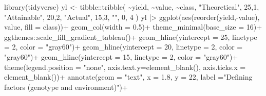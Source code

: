 \documentclass[
  letterpaper,
  DIV=11,
  numbers=noendperiod]{scrreprt}
\newenvironment{Shaded}{\begin{snugshade}}{\end{snugshade}}
\newcommand{\AttributeTok}[1]{\textcolor[rgb]{0.40,0.45,0.13}{#1}}
\newcommand{\DecValTok}[1]{\textcolor[rgb]{0.68,0.00,0.00}{#1}}
\newcommand{\FloatTok}[1]{\textcolor[rgb]{0.68,0.00,0.00}{#1}}
\newcommand{\FunctionTok}[1]{\textcolor[rgb]{0.28,0.35,0.67}{#1}}
\newcommand{\NormalTok}[1]{\textcolor[rgb]{0.00,0.23,0.31}{#1}}
\newcommand{\OtherTok}[1]{\textcolor[rgb]{0.00,0.23,0.31}{#1}}
\newcommand{\SpecialCharTok}[1]{\textcolor[rgb]{0.37,0.37,0.37}{#1}}
\newcommand{\StringTok}[1]{\textcolor[rgb]{0.13,0.47,0.30}{#1}}
\begin{document}
\begin{Shaded}
\begin{Highlighting}[]
\FunctionTok{library}\NormalTok{(tidyverse)}
\NormalTok{yl }\OtherTok{\textless{}{-}}\NormalTok{ tibble}\SpecialCharTok{::}\FunctionTok{tribble}\NormalTok{(}
  \SpecialCharTok{\textasciitilde{}}\NormalTok{yield, }\SpecialCharTok{\textasciitilde{}}\NormalTok{value, }\SpecialCharTok{\textasciitilde{}}\NormalTok{class,}
  \StringTok{"Theoretical"}\NormalTok{, }\DecValTok{25}\NormalTok{,}\DecValTok{1}\NormalTok{,}
  \StringTok{"Attainable"}\NormalTok{, }\DecValTok{20}\NormalTok{,}\DecValTok{2}\NormalTok{,}
  \StringTok{"Actual"}\NormalTok{, }\DecValTok{15}\NormalTok{,}\DecValTok{3}\NormalTok{,}
  \StringTok{""}\NormalTok{, }\DecValTok{0}\NormalTok{, }\DecValTok{4}
\NormalTok{)}
\NormalTok{yl }\SpecialCharTok{|\textgreater{}} 
  \FunctionTok{ggplot}\NormalTok{(}\FunctionTok{aes}\NormalTok{(}\FunctionTok{reorder}\NormalTok{(yield,}\SpecialCharTok{{-}}\NormalTok{value), value, }\AttributeTok{fill =}\NormalTok{ class))}\SpecialCharTok{+}
  \FunctionTok{geom\_col}\NormalTok{(}\AttributeTok{width =} \FloatTok{0.5}\NormalTok{)}\SpecialCharTok{+}
  \FunctionTok{theme\_minimal}\NormalTok{(}\AttributeTok{base\_size =} \DecValTok{16}\NormalTok{)}\SpecialCharTok{+}
\NormalTok{  ggthemes}\SpecialCharTok{::}\FunctionTok{scale\_fill\_gradient\_tableau}\NormalTok{()}\SpecialCharTok{+}
  \FunctionTok{geom\_hline}\NormalTok{(}\AttributeTok{yintercept =} \DecValTok{25}\NormalTok{, }\AttributeTok{linetype =} \DecValTok{2}\NormalTok{, }\AttributeTok{color =} \StringTok{"gray60"}\NormalTok{)}\SpecialCharTok{+}
  \FunctionTok{geom\_hline}\NormalTok{(}\AttributeTok{yintercept =} \DecValTok{20}\NormalTok{, }\AttributeTok{linetype =} \DecValTok{2}\NormalTok{, }\AttributeTok{color =} \StringTok{"gray60"}\NormalTok{)}\SpecialCharTok{+}
  \FunctionTok{geom\_hline}\NormalTok{(}\AttributeTok{yintercept =} \DecValTok{15}\NormalTok{, }\AttributeTok{linetype =} \DecValTok{2}\NormalTok{, }\AttributeTok{color =} \StringTok{"gray60"}\NormalTok{)}\SpecialCharTok{+}
  \FunctionTok{theme}\NormalTok{(}\AttributeTok{legend.position =} \StringTok{"none"}\NormalTok{, }
        \AttributeTok{axis.text.y=}\FunctionTok{element\_blank}\NormalTok{(),}
        \AttributeTok{axis.ticks.x =} \FunctionTok{element\_blank}\NormalTok{())}\SpecialCharTok{+}
  \FunctionTok{annotate}\NormalTok{(}\AttributeTok{geom =} \StringTok{"text"}\NormalTok{, }\AttributeTok{x =} \FloatTok{1.8}\NormalTok{, }\AttributeTok{y =} \DecValTok{22}\NormalTok{, }\AttributeTok{label =}\StringTok{"Defining factors }
\StringTok{           (genotype and environment)"}\NormalTok{)}\SpecialCharTok{+}

\end{Highlighting}
\end{Shaded}
\end{document}
